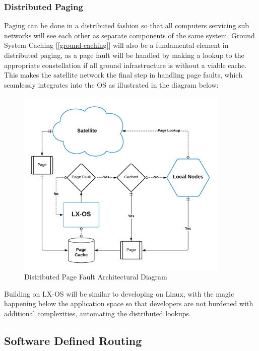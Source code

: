 \documentclass[11pt]{article}
\begin{document}
\subsubsection{Distributed Paging}

Paging can be done in a distributed fashion so that all computers servicing sub networks will see each other as separate components of the same system. 
Ground System Caching [\ref{ground-caching}] will also be a fundamental element in distributed paging, as a page fault will be handled by making a lookup to the appropriate constellation if all ground infrastructure is without a viable cache.
This makes the satellite network the final step in handling page faults, which seamlessly integrates into the OS as illustrated in the diagram below:

\smallskip
\begin{figure}[h]
    \centering
    \includegraphics[width=0.9\textwidth]{./images/rsz_page_fault.png}
    \caption{Distributed Page Fault Architectural Diagram}
\end{figure}

\noindent Building on LX-OS will be similar to developing on Linux, with the magic happening below the application space so that developers are not burdened with additional complexities, automating the distributed lookups.


\subsection{Software Defined Routing}
\label{software-routing}
\end{document}
